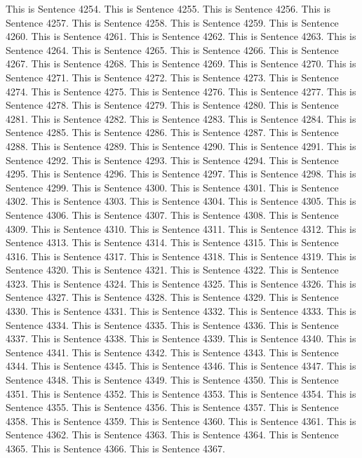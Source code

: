 \documentclass{article}
\begin{document}
This is Sentence 4254.
This is Sentence 4255.
This is Sentence 4256.
This is Sentence 4257.
This is Sentence 4258.
This is Sentence 4259.
This is Sentence 4260.
This is Sentence 4261.
This is Sentence 4262.
This is Sentence 4263.
This is Sentence 4264.
This is Sentence 4265.
This is Sentence 4266.
This is Sentence 4267.
This is Sentence 4268.
This is Sentence 4269.
This is Sentence 4270.
This is Sentence 4271.
This is Sentence 4272.
This is Sentence 4273.
This is Sentence 4274.
This is Sentence 4275.
This is Sentence 4276.
This is Sentence 4277.
This is Sentence 4278.
This is Sentence 4279.
This is Sentence 4280.
This is Sentence 4281.
This is Sentence 4282.
This is Sentence 4283.
This is Sentence 4284.
This is Sentence 4285.
This is Sentence 4286.
This is Sentence 4287.
This is Sentence 4288.
This is Sentence 4289.
This is Sentence 4290.
This is Sentence 4291.
This is Sentence 4292.
This is Sentence 4293.
This is Sentence 4294.
This is Sentence 4295.
This is Sentence 4296.
This is Sentence 4297.
This is Sentence 4298.
This is Sentence 4299.
This is Sentence 4300.
This is Sentence 4301.
This is Sentence 4302.
This is Sentence 4303.
This is Sentence 4304.
This is Sentence 4305.
This is Sentence 4306.
This is Sentence 4307.
This is Sentence 4308.
This is Sentence 4309.
This is Sentence 4310.
This is Sentence 4311.
This is Sentence 4312.
This is Sentence 4313.
This is Sentence 4314.
This is Sentence 4315.
This is Sentence 4316.
This is Sentence 4317.
This is Sentence 4318.
This is Sentence 4319.
This is Sentence 4320.
This is Sentence 4321.
This is Sentence 4322.
This is Sentence 4323.
This is Sentence 4324.
This is Sentence 4325.
This is Sentence 4326.
This is Sentence 4327.
This is Sentence 4328.
This is Sentence 4329.
This is Sentence 4330.
This is Sentence 4331.
This is Sentence 4332.
This is Sentence 4333.
This is Sentence 4334.
This is Sentence 4335.
This is Sentence 4336.
This is Sentence 4337.
This is Sentence 4338.
This is Sentence 4339.
This is Sentence 4340.
This is Sentence 4341.
This is Sentence 4342.
This is Sentence 4343.
This is Sentence 4344.
This is Sentence 4345.
This is Sentence 4346.
This is Sentence 4347.
This is Sentence 4348.
This is Sentence 4349.
This is Sentence 4350.
This is Sentence 4351.
This is Sentence 4352.
This is Sentence 4353.
This is Sentence 4354.
This is Sentence 4355.
This is Sentence 4356.
This is Sentence 4357.
This is Sentence 4358.
This is Sentence 4359.
This is Sentence 4360.
This is Sentence 4361.
This is Sentence 4362.
This is Sentence 4363.
This is Sentence 4364.
This is Sentence 4365.
This is Sentence 4366.
This is Sentence 4367.
\end{document}
